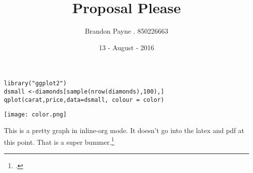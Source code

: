 \documentclass[koma, a4paper, utopia, 12pt]{article}
\author{Brandon Payne . 850226663\\
}
\date{13 - August - 2016}
\title{Proposal Please}\\\medskip
\begin{document}
\maketitle
\begin{verbatim}
library("ggplot2")
dsmall <-diamonds[sample(nrow(diamonds),100),]
qplot(carat,price,data=dsmall, colour = color)
\end{verbatim}

\texttt{[image: color.png]}

This is a pretty graph in inline-org mode.  It doesn't go into the latex and pdf at this point.
That is a super bummer.\footcite[][23-25]{ganzeboom1993}

\nocite{*}
\printbibliography
\end{document}
